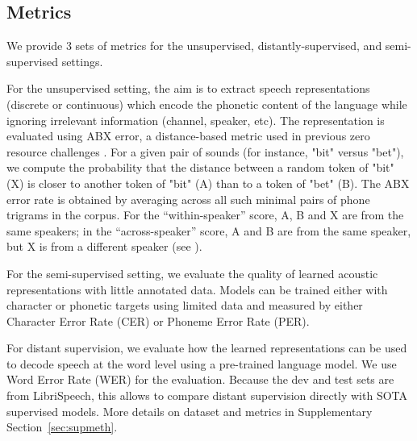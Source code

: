\documentclass{article}
\begin{document}
\vspace{-8pt}
\subsection{Metrics}
\label{sec:metrics}
\vspace{-5pt}

We provide 3 sets of metrics for the unsupervised, distantly-supervised, and semi-supervised settings. 

For the unsupervised setting, the aim is to extract speech representations (discrete or continuous) which encode the phonetic content of the language while ignoring irrelevant information (channel, speaker, etc). The representation is evaluated using  ABX error, a distance-based metric used in previous zero resource challenges \cite{Versteegh2016,dunbar2017,dunbar2019}. For a given pair of sounds (for instance, "bit" versus "bet"), we compute the probability that the distance between a random token of "bit" (X) is closer to another token of "bit" (A) than to a token of "bet" (B). The ABX error rate is obtained by averaging across all such minimal pairs of phone trigrams in the corpus. For the ``within-speaker'' score, A, B and X are from the same speakers; in the ``across-speaker'' score, A and B are from the same speaker, but X is from a different speaker (see \cite{schatz2016abx}).

For the semi-supervised setting, we evaluate the quality of learned acoustic representations with little annotated data. Models can be trained either with character or phonetic targets using limited data and measured by either Character Error Rate (CER) or Phoneme Error Rate (PER).

For distant supervision, we evaluate how the learned representations can be used to decode speech at the word level using a pre-trained language model. We use Word Error Rate (WER) for the evaluation. Because the dev and test sets are from LibriSpeech, this allows to compare distant supervision directly with SOTA supervised models. More details on dataset and metrics in Supplementary Section~\ref{sec:supmeth}. 
\end{document}
